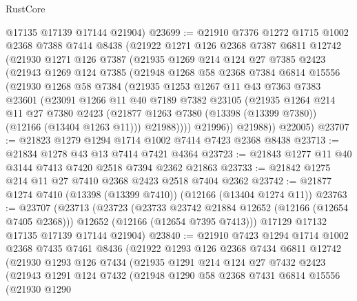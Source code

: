 \begin{lexlean}{RustCore}
\begin{coremodule}
      @17135
      @17139
      @17144
      @21904)
@23699 := @21910
    @7376
    @1272
    @1715
    @1002
    @2368
    @7388
    @7414
    @8438
    (@21922
      @1271
      @126
      @2368
      @7387
      @6811
      @12742
      (@21930
        @1271
        @126
        @7387
        (@21935
          @1269
          @214
          @124
          @27
          @7385
          @2423
          (@21943
            @1269
            @124
            @7385
            (@21948
              @1268
              @58
              @2368
              @7384
              @6814
              @15556
              (@21930
                @1268
                @58
                @7384
                (@21935
                  @1253
                  @1267
                  @11
                  @43
                  @7363
                  @7383
                  @23601
                  (@23091
                    @1266
                    @11
                    @40
                    @7189
                    @7382
                    @23105
                    (@21935
                      @1264
                      @214
                      @11
                      @27
                      @7380
                      @2423
                      (@21877 @1263 @7380 (@13398 (@13399 @7380)) (@12166 (@13404 @1263 @11)))
                      @21988))))
              @21996))
          @21988))
      @22005)
@23707 := @21823 @1279 @1294 @1714 @1002 @7414 @7423 @2368 @8438
@23713 := @21834 @1278 @43 @13 @7414 @7421 @4364
@23723 := @21843 @1277 @11 @40 @3144 @7413 @7420 @2518 @7394 @2362 @21863
@23733 := @21842 @1275 @214 @11 @27 @7410 @2368 @2423 @2518 @7404 @2362
@23742 := @21877 @1274 @7410 (@13398 (@13399 @7410)) (@12166 (@13404 @1274 @11))
@23763 := @23707
    (@23713
      (@23723
        (@23733 @23742 @21884 @12652 (@12166 (@12654 @7405 @2368)))
        @12652
        (@12166 (@12654 @7395 @7413)))
      @17129
      @17132
      @17135
      @17139
      @17144
      @21904)
@23840 := @21910
    @7423
    @1294
    @1714
    @1002
    @2368
    @7435
    @7461
    @8436
    (@21922
      @1293
      @126
      @2368
      @7434
      @6811
      @12742
      (@21930
        @1293
        @126
        @7434
        (@21935
          @1291
          @214
          @124
          @27
          @7432
          @2423
          (@21943
            @1291
            @124
            @7432
            (@21948
              @1290
              @58
              @2368
              @7431
              @6814
              @15556
              (@21930
                @1290

\end{coremodule}
\end{lexlean}
